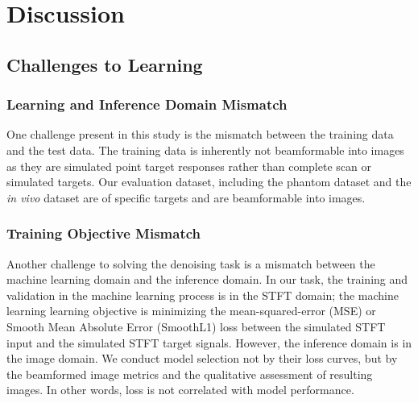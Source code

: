 \chapter{Discussion}

\section{Challenges to Learning}

  \subsection{Learning and Inference Domain Mismatch}
  One challenge present in this study is the mismatch between the training data and the test data. The training data is inherently not beamformable into images as they are simulated point target responses rather than complete scan or simulated targets. Our evaluation dataset, including the phantom dataset and the \textit{in vivo} dataset are of specific targets and are beamformable into images.

  \subsection{Training Objective Mismatch}
  Another challenge to solving the denoising task is a mismatch between the machine learning domain and the inference domain. In our task, the training and validation in the machine learning process is in the STFT domain; the machine learning learning objective is minimizing the mean-squared-error (MSE) or Smooth Mean Absolute Error (SmoothL1) loss between the simulated STFT input and the simulated STFT target signals. However, the inference domain is in the image domain. We conduct model selection not by their loss curves, but by the beamformed image metrics and the qualitative assessment of resulting images. In other words, loss is not correlated with model performance.



